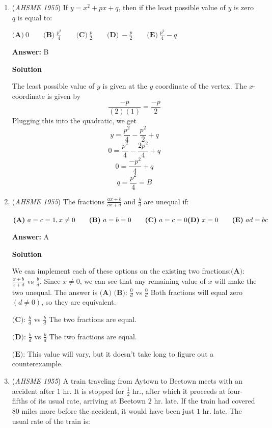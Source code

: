 \begin{enumerate}
	\item (\textit{AHSME 1955}) If $y=x^2+px+q$, then if the least possible value of $y$ is zero $q$ is equal to: 


 $\textbf{(A)}\ 0\qquad\textbf{(B)}\ \frac{p^2}{4}\qquad\textbf{(C)}\ \frac{p}{2}\qquad\textbf{(D)}\ -\frac{p}{2}\qquad\textbf{(E)}\ \frac{p^2}{4}-q$

 \textbf{Answer: }B



\textbf{Solution}

The least possible value of $y$ is given at the $y$ coordinate of the vertex. The $x$- coordinate is given by 
 \[\frac{-p}{(2)(1)} = \frac{-p}{2}\] Plugging this into the quadratic, we get
 \[y = \frac{p^2}{4} - \frac{p^2}{2} + q\]
 \[0 = \frac{p^2}{4} - \frac{2p^2}{4} + q\]
 \[0 = \frac{-p^2}{4} + q\]
 \[q = \frac{p^2}{4} = \boxed{B}\]



	\item (\textit{AHSME 1955}) The fractions $\frac{ax+b}{cx+d}$ and $\frac{b}{d}$ are unequal if: 


 $\textbf{(A)}\ a=c=1, x\neq 0\qquad\textbf{(B)}\ a=b=0\qquad\textbf{(C)}\ a=c=0\\ \textbf{(D)}\ x=0\qquad\textbf{(E)}\ ad=bc$

 \textbf{Answer: }A



\textbf{Solution}

We can implement each of these options on the existing two fractions:$\textbf{(A)}$: $\frac{x+b}{x+d}$ vs $\frac{b}{d}$. Since $x \neq 0$, we can see that any remaining value of $x$ will make the two unequal. The answer is $\boxed{\textbf{(A)}}$
$\textbf{(B)}$: $\frac{0}{d}$ vs $\frac{0}{d}$ Both fractions will equal zero $(d \neq 0)$, so they are equivalent.

 $\textbf{(C)}$: $\frac{b}{d}$ vs $\frac{b}{d}$ The two fractions are equal. 

 $\textbf{(D)}$: $\frac{b}{d}$ vs $\frac{b}{d}$ The two fractions are equal.

 $\textbf{(E)}$: This value will vary, but it doesn't take long to figure out a counterexample.

 


	\item (\textit{AHSME 1955}) A train traveling from Aytown to Beetown meets with an accident after $1$ hr. It is stopped for $\frac{1}{2}$ hr., 
after which it proceeds at four-fifths of its usual rate, arriving at Beetown $2$ hr. late. 
If the train had covered $80$ miles more before the accident, it would have been just $1$ hr. late. 
The usual rate of the train is: 



\end{enumerate}
